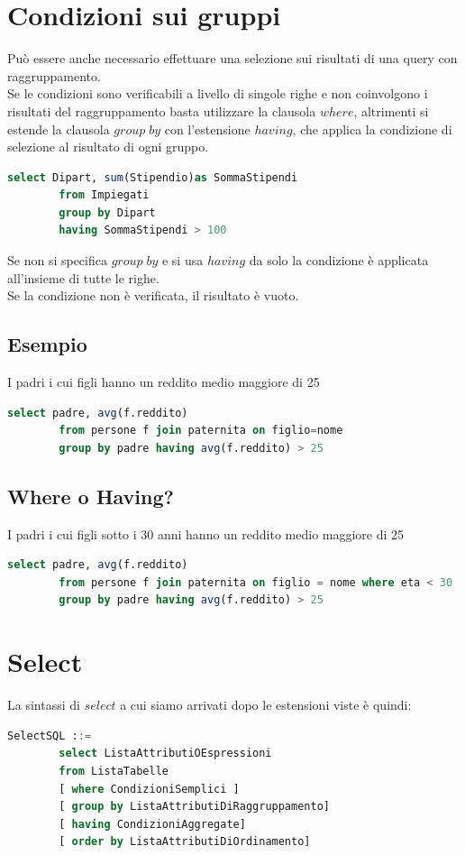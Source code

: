 \documentclass{article}
\begin{document}
	\section{Condizioni sui gruppi}
	Può essere anche necessario effettuare una selezione sui risultati di una query con raggruppamento.\\
	Se le condizioni sono verificabili a livello di singole righe e non coinvolgono i risultati del raggruppamento basta utilizzare la clausola $where$, altrimenti si estende la clausola $group \; by$ con l’estensione $having$, che applica la condizione di selezione al risultato di ogni gruppo.
	\begin{lstlisting}[language=SQL]
		select Dipart, sum(Stipendio)as SommaStipendi
		from Impiegati
		group by Dipart
		having SommaStipendi > 100
	\end{lstlisting}
	Se non si specifica $group \; by$ e si usa $having$ da solo la condizione è applicata all'insieme di tutte le righe. \\
	Se la
	condizione non è verificata, il risultato è vuoto.
	\subsection{Esempio}
	I padri i cui figli hanno un reddito medio maggiore di 25
	\begin{lstlisting}[language=SQL]
		select padre, avg(f.reddito)
		from persone f join paternita on figlio=nome
		group by padre having avg(f.reddito) > 25
	\end{lstlisting}
	\subsection{Where o Having?}
	I padri i cui figli sotto i 30 anni hanno un reddito medio maggiore di 25
	\begin{lstlisting}[language=SQL]
		select padre, avg(f.reddito)
		from persone f join paternita on figlio = nome where eta < 30
		group by padre having avg(f.reddito) > 25
	\end{lstlisting}
	\section{Select}
	La sintassi di $select$ a cui siamo arrivati dopo le estensioni viste è quindi:
	\begin{lstlisting}[language=SQL]
		SelectSQL ::= 
		select ListaAttributiOEspressioni
		from ListaTabelle
		[ where CondizioniSemplici ]
		[ group by ListaAttributiDiRaggruppamento]
		[ having CondizioniAggregate]
		[ order by ListaAttributiDiOrdinamento]
	\end{lstlisting}
\end{document}
